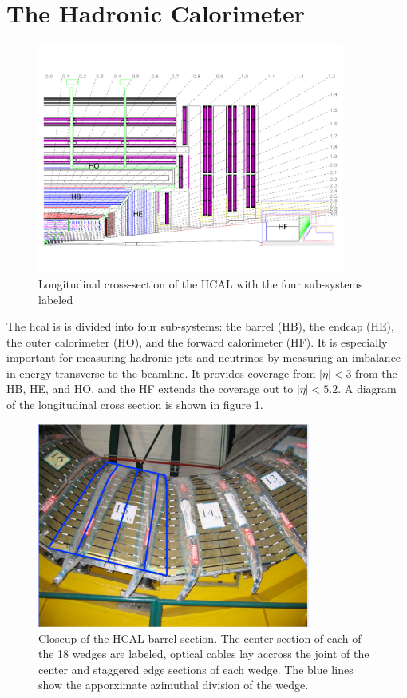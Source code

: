 \section{The Hadronic Calorimeter}
\label{hcal_description}

\begin{figure}[h]
   \centering
  \includegraphics[width=0.9\textwidth]{Figures/CMS_Diagrams/HCAL__Layout.pdf}
  \caption{Longitudinal cross-section of the HCAL with the four
    sub-systems labeled} \label{fig:hcal_layout}
\end{figure}

\par The \acrfull{hcal} is is divided into four sub-systems: the
barrel (HB), the endcap (HE), the outer calorimeter (HO), and the
forward calorimeter (HF).   It is especially important for measuring
hadronic jets and neutrinos by measuring an imbalance in energy
transverse to the beamline.  It provides coverage from $|\eta|<3$ from
the HB, HE, and HO, and the HF extends the coverage out to
$|\eta|<5.2$.  A diagram of the longitudinal cross
section is shown in figure \ref{fig:hcal_layout}.

\begin{figure}[h]
   \centering
  \includegraphics[width=0.8\textwidth]{Figures/CMS_Diagrams/HCAL__Wedge_WithAzDiv.pdf}
  \caption{Closeup of the HCAL barrel section.  The center section of
    each of the 18 wedges are labeled, optical cables lay accross the
    joint of the center and staggered edge sections of each wedge.
    The blue lines show the apporximate azimuthal division of the
    wedge.} \label{fig:hcal_hb_wedge}
\end{figure}

